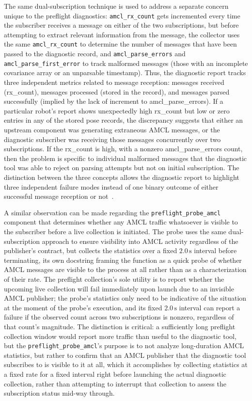 The same dual-subscription technique is used to address a separate concern unique to the preflight diagnostics: \texttt{amcl\_rx\_count} gets incremented every time the subscriber receives a message on either of the two subscriptions, but before attempting to extract relevant information from the message, the collector uses the same \texttt{amcl\_rx\_count} to determine the number of messages that have been passed to the diagnostic record, and \texttt{amcl\_parse\_errors} and \texttt{amcl\_parse\_first\_error} to track malformed messages (those with an incomplete covariance array or an unparsable timestamp). Thus, the diagnostic report tracks three independent metrics related to message reception: messages received (rx\_count), messages processed (stored in the record), and messages parsed successfully (implied by the lack of increment to amcl\_parse\_errors). If a particular robot's report shows unexpectedly high rx\_count but low or zero entries in any of the stored pose records, the discrepancy suggests that either an upstream component was generating extraneous AMCL messages, or the diagnostic subscriber was receiving those messages concurrently over two subscriptions. If the rx\_count is high, with a nonzero amcl\_parse\_errors count, then the problem is specific to individual malformed messages that the diagnostic tool was able to reject on parsing attempts but not on initial subscription. The distinction between the three concepts allows the diagnostic report to highlight three independent failure modes instead of one binary outcome of either successful message reception or not~\cite{lee2025dependency}.

A similar observation can be made regarding the \texttt{preflight\_probe\_amcl} component that determines whether any AMCL traffic whatsoever is visible to the subscriber before a live collection is initiated. The probe uses the same dual-subscription approach to ensure visibility into AMCL activity regardless of the publisher's contract, but collects the statistics over a fixed $2.0\,\text{s}$ interval before terminating, its own docstring framing the function as a quick probe of whether AMCL messages are visible to the process at all rather than as a characterization of their rate. The preflight collection's sole utility is to report whether the upcoming live collection will fail immediately upon launch due to an invisible AMCL publisher; the probe's statistics only need to be indicative of the situation at the moment of the probe's execution, and its fixed $2.0\,\text{s}$ interval can report a failure if the observed count across two subscriptions is nonzero, regardless of that count's magnitude. The distinction is critical: a sufficiently long preflight collection window would report more traffic than useful to the diagnostic tool, but the \texttt{preflight\_probe\_amcl}'s purpose is to not analyze long-duration AMCL statistics, but rather to confirm that an AMCL publisher that the diagnostic tool subscribes to is visible to it at all, which it accomplishes by collecting statistics at a fixed rate for a fixed interval right before launching the actual diagnostic collection, rather than attempting to interrupt that collection to assess the subscription status mid-way through.

